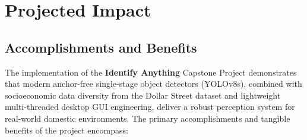 \chapter{Projected Impact}
\label{chap:projected_impact}

\section{Accomplishments and Benefits}
\label{sec:accomplishments}

The implementation of the \textbf{Identify Anything} Capstone Project demonstrates that modern anchor-free single-stage object detectors (YOLOv8s), combined with socioeconomic data diversity from the Dollar Street dataset and lightweight multi-threaded desktop GUI engineering, deliver a robust perception system for real-world domestic environments. The primary accomplishments and tangible benefits of the project encompass:

